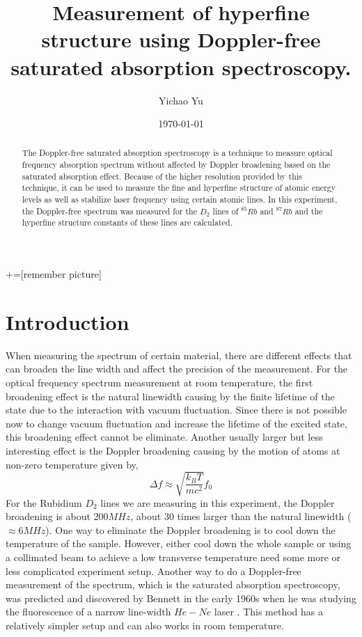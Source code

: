 \documentclass[aps,twocolumn,secnumarabic,balancelastpage,amsmath,amssymb,nofootinbib]{revtex4}
\begin{document}
+=[remember picture]
\title{Measurement of hyperfine structure using Doppler-free saturated absorption spectroscopy.}
\author{Yichao Yu}
\date{\today}

\begin{abstract}
  The Doppler-free saturated absorption spectroscopy is a technique to measure optical frequency absorption spectrum without affected by Doppler broadening based on the saturated absorption effect. Because of the higher resolution provided by this technique, it can be used to measure the fine and hyperfine structure of atomic energy levels as well as stabilize laser frequency using certain atomic lines. In this experiment, the Doppler-free spectrum was measured for the $D_2$ lines of ${}^{85}Rb$ and ${}^{87}Rb$ and the hyperfine structure constants of these lines are calculated.
\end{abstract}

\maketitle
\section*{Introduction}
When measuring the spectrum of certain material, there are different effects that can broaden the line width and affect the precision of the measurement. For the optical frequency spectrum measurement at room temperature, the first broadening effect is the natural linewidth causing by the finite lifetime of the state due to the interaction with vacuum fluctuation. Since there is not possible now to change vacuum fluctuation and increase the lifetime of the excited state, this broadening effect cannot be eliminate. Another usually larger but less interesting effect is the Doppler broadening causing by the motion of atoms at non-zero temperature given by,
\[ \Delta f\approx\sqrt{\frac{k_BT}{mc^2}}f_0 \]
For the Rubidium $D_2$ lines we are measuring in this experiment, the Doppler broadening is about $200MHz$, about $30$ times larger than the natural linewidth ($\approx6MHz$). One way to eliminate the Doppler broadening is to cool down the temperature of the sample. However, either cool down the whole sample or using a collimated beam to achieve a low transverse temperature need some more or less complicated experiment setup. Another way to do a Doppler-free measurement of the spectrum, which is the saturated absorption spectroscopy, was predicted and discovered by Bennett in the early 1960s when he was studying the fluorescence of a narrow line-width $He-Ne$ laser \cite{he_ne_hole}. This method has a relatively simpler setup and can also works in room temperature.
\end{document}
